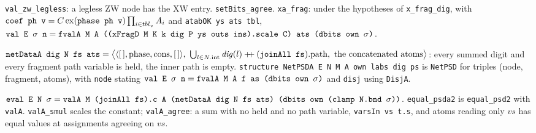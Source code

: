 \begin{theorem}
\textnormal{\texttt{val\_\allowbreak{}zw\_\allowbreak{}legless}}: a legless ZW node has the XW entry. \textnormal{\texttt{setBits\_\allowbreak{}agree}}.
\textnormal{\texttt{xa\_\allowbreak{}frag}}: under the hypotheses of \textnormal{\texttt{x\_\allowbreak{}frag\_\allowbreak{}dig}}, with
$\textnormal{\texttt{coef ph v}} = C\operatorname{ex}(\textnormal{\texttt{phase ph v}})\prod_{i\in tbl_v}A_i$ and
\textnormal{\texttt{atabOK ys ats tbl}},
$\textnormal{\texttt{val E \ensuremath{\sigma} n}} = \textnormal{\texttt{fvalA M A (\allowbreak{}(\allowbreak{}xFragD M K k dig P ys outs ins).\allowbreak{}scale C) ats (\allowbreak{}dbits own \ensuremath{\sigma})}}$.
\end{theorem}

\begin{definition}\label{def:lean-pathsum-netpsda}
$\textnormal{\texttt{netDataA dig N fs ats}} = \bigl\langle\langle[\,], \text{phase}, \text{cons}, [\,]\rangle,\ \bigcup_{l\in N.\text{int}}\mathit{dig}(l)\mathbin{+\!\!+}(\textnormal{\texttt{joinAll fs}}).\text{path},\ \text{the concatenated atoms}\bigr\rangle$:
every summed digit and every fragment path variable is held, the inner path is empty.
\textnormal{\texttt{structure NetPSDA E N M A own labs dig ps}} is \textnormal{\texttt{NetPSD}} for triples (node, fragment,
atoms), with \textnormal{\texttt{node}} stating $\textnormal{\texttt{val E \ensuremath{\sigma} n}} = \textnormal{\texttt{fvalA M A f as (\allowbreak{}dbits own \ensuremath{\sigma})}}$ and
\textnormal{\texttt{disj}} using \textnormal{\texttt{DisjA}}.
\end{definition}

\begin{theorem}
$\textnormal{\texttt{eval E N \ensuremath{\sigma}}} = \textnormal{\texttt{valA M (\allowbreak{}joinAll fs).\allowbreak{}c A (\allowbreak{}netDataA dig N fs ats) (\allowbreak{}dbits own (\allowbreak{}clamp N.\allowbreak{}bnd \ensuremath{\sigma}))}}$.
\textnormal{\texttt{equal\_\allowbreak{}psda2}} is \textnormal{\texttt{equal\_\allowbreak{}psd2}} with \textnormal{\texttt{valA}}. \textnormal{\texttt{valA\_\allowbreak{}smul}} scales the constant;
\textnormal{\texttt{valA\_\allowbreak{}agree}}: a sum with no held and no path variable, \textnormal{\texttt{varsIn vs t.\allowbreak{}s}}, and atoms reading
only $vs$ has equal values at assignments agreeing on $vs$.
\end{theorem}

